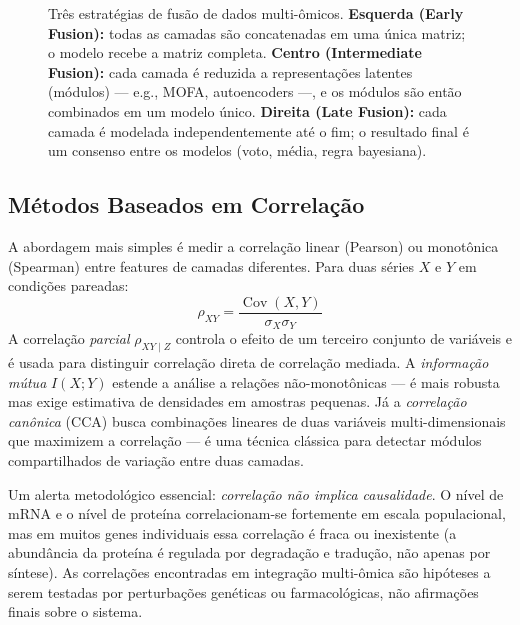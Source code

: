 \begin{figure}[htbp]
\caption{Três estratégias de fusão de dados multi-ômicos. \textbf{Esquerda (Early Fusion):} todas as camadas são concatenadas em uma única matriz; o modelo recebe a matriz completa. \textbf{Centro (Intermediate Fusion):} cada camada é reduzida a representações latentes (módulos) --- e.g., MOFA, autoencoders ---, e os módulos são então combinados em um modelo único. \textbf{Direita (Late Fusion):} cada camada é modelada independentemente até o fim; o resultado final é um consenso entre os modelos (voto, média, regra bayesiana).}
\label{fig:11-fusao}
\end{figure}

\subsection{Métodos Baseados em Correlação}
\label{sub:image11-correlacao}

A abordagem mais simples é medir a correlação linear (Pearson) ou monotônica
(Spearman) entre features de camadas diferentes. Para duas séries $X$ e $Y$ em
condições pareadas:
\begin{equation}
\rho_{XY} = \frac{\operatorname{Cov}(X, Y)}{\sigma_X \sigma_Y}
\end{equation}
A correlação \emph{parcial} $\rho_{XY \mid Z}$ controla o efeito de um terceiro
conjunto de variáveis e é usada para distinguir correlação direta de
correlação mediada. A \emph{informação mútua} $I(X;Y)$ estende a análise a
relações não-monotônicas --- é mais robusta mas exige estimativa de densidades
em amostras pequenas. Já a \emph{correlação canônica} (CCA) busca combinações
lineares de duas variáveis multi-dimensionais que maximizem a correlação --- é
uma técnica clássica para detectar módulos compartilhados de variação entre
duas camadas.

Um alerta metodológico essencial: \emph{correlação não implica causalidade}. O
nível de mRNA e o nível de proteína correlacionam-se fortemente em escala
populacional, mas em muitos genes individuais essa correlação é fraca ou
inexistente (a abundância da proteína é regulada por degradação e tradução,
não apenas por síntese). As correlações encontradas em integração
multi-ômica são hipóteses a serem testadas por perturbações genéticas ou
farmacológicas, não afirmações finais sobre o sistema.

